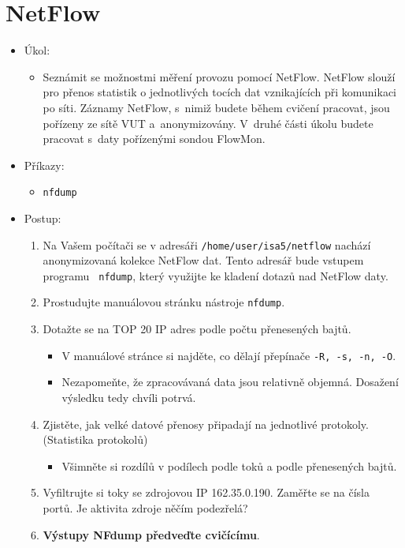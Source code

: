 \section{NetFlow}
\begin{itemize}
	\item Úkol:
	\begin{itemize}
		\item Seznámit se možnostmi měření provozu pomocí NetFlow. NetFlow slouží pro
		přenos statistik o jednotlivých tocích dat vznikajících při komunikaci po síti.
		Záznamy NetFlow, s~nimiž budete během cvičení pracovat, jsou
		pořízeny ze sítě VUT a~anonymizovány. V~druhé části úkolu
		budete pracovat s~daty pořízenými sondou FlowMon.
	\end{itemize}
	\item Příkazy:
	\begin{itemize}
		\item {\tt nfdump}
	\end{itemize}
	\item Postup:
	\begin{enumerate}
		\item Na Vašem počítači se v adresáři {\tt /home/user/isa5/netflow} nachází
		anonymizovaná kolekce NetFlow dat. Tento adresář bude vstupem programu
		{\tt
nfdump}, který využijte ke kladení dotazů nad NetFlow daty.
		\item Prostudujte manuálovou stránku nástroje {\tt nfdump}.
		\item Dotažte se na TOP 20 IP adres podle počtu přenesených bajtů. 
		\begin{itemize}
			\item V manuálové stránce si najděte, co dělají přepínače {\tt -R, -s, -n, -O}.
			\item Nezapomeňte, že zpracovávaná data jsou relativně objemná. Dosažení výsledku tedy chvíli potrvá.
		\end{itemize}
		\item Zjistěte, jak velké datové přenosy připadají na jednotlivé protokoly. (Statistika protokolů)
		\begin{itemize}
			\item Všimněte si rozdílů v podílech podle toků a podle přenesených bajtů.
		\end{itemize}
		\item Vyfiltrujte si toky se zdrojovou IP 162.35.0.190. Zaměřte se na čísla portů.
		Je aktivita zdroje něčím podezřelá?
		
		\item {\bf Výstupy NFdump předveďte cvičícímu}.
	\end{enumerate}
\end{itemize}

